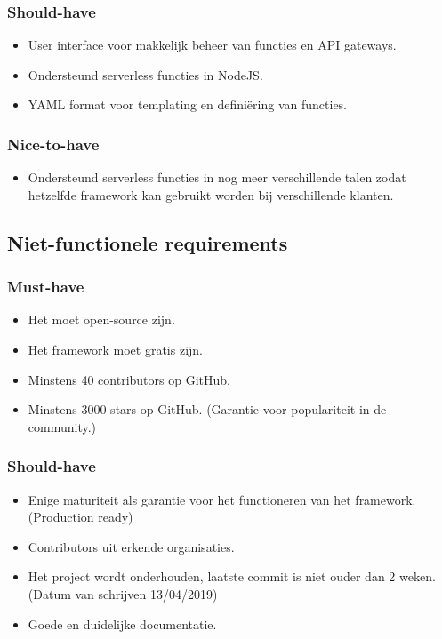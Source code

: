 \subsubsection{Should-have}
\begin{itemize}
    \item User interface voor makkelijk beheer van functies en API gateways.
    \item Ondersteund serverless functies in NodeJS.
    \item YAML format voor templating en definiëring van functies.
\end{itemize}
\subsubsection{Nice-to-have}
\begin{itemize}
    \item Ondersteund serverless functies in nog meer verschillende talen zodat hetzelfde framework kan gebruikt worden bij verschillende klanten.
\end{itemize}
\subsection{Niet-functionele requirements}
\subsubsection{Must-have}
\begin{itemize}
    \item Het moet open-source zijn.
    \item Het framework moet gratis zijn.
    \item Minstens 40 contributors op GitHub.
    \item Minstens 3000 stars op GitHub. (Garantie voor populariteit in de community.)
\end{itemize}
\subsubsection{Should-have}
\begin{itemize}
    \item Enige maturiteit als garantie voor het functioneren van het framework. (Production ready)
    \item Contributors uit erkende organisaties.
    \item Het project wordt onderhouden, laatste commit is niet ouder dan 2 weken. (Datum van schrijven 13/04/2019)
    \item Goede en duidelijke documentatie.
\end{itemize}
